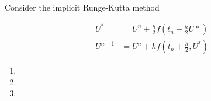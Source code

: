 Consider the implicit Runge-Kutta method

\begin{align*}
  U^* &= U^n + \frac{h}{2} f\left( t_n + \frac{h}{2} U* \right) \\
  U^{n+1} &= U^n + h f\left(t_n + \frac{h}{2}, U^* \right)
\end{align*}


\begin{enumerate}
  \item 
  \pagebreak
  \item 
  \pagebreak
  \item 
\end{enumerate} 